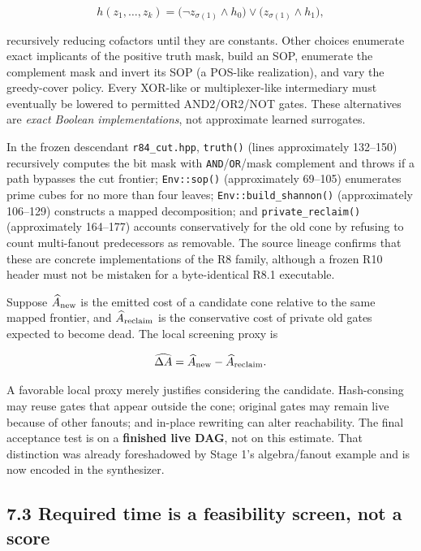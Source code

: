 \[
h(z_1,\ldots,z_k)
=\bigl(\neg z_{\sigma(1)}\land h_0\bigr)
 \lor\bigl(z_{\sigma(1)}\land h_1\bigr),
\]

recursively reducing cofactors until they are constants. Other choices enumerate exact implicants of the positive truth mask, build an SOP, enumerate the complement mask and invert its SOP (a POS-like realization), and vary the greedy-cover policy. Every XOR-like or multiplexer-like intermediary must eventually be lowered to permitted AND2/OR2/NOT gates. These alternatives are \emph{exact Boolean implementations}, not approximate learned surrogates.

In the frozen descendant \texttt{r84\_cut.hpp}, \texttt{truth()} (lines approximately 132--150) recursively computes the bit mask with \texttt{AND}/\texttt{OR}/mask complement and throws if a path bypasses the cut frontier; \texttt{Env::sop()} (approximately 69--105) enumerates prime cubes for no more than four leaves; \texttt{Env::build\_shannon()} (approximately 106--129) constructs a mapped decomposition; and \texttt{private\_reclaim()} (approximately 164--177) accounts conservatively for the old cone by refusing to count multi-fanout predecessors as removable. The source lineage confirms that these are concrete implementations of the R8 family, although a frozen R10 header must not be mistaken for a byte-identical R8.1 executable.

Suppose \(\widehat A_{\rm new}\) is the emitted cost of a candidate cone relative to the same mapped frontier, and \(\widehat A_{\rm reclaim}\) is the conservative cost of private old gates expected to become dead. The local screening proxy is

\[
\widehat{\Delta A}=\widehat A_{\rm new}-\widehat A_{\rm reclaim}.
\]

A favorable local proxy merely justifies considering the candidate. Hash-consing may reuse gates that appear outside the cone; original gates may remain live because of other fanouts; and in-place rewriting can alter reachability. The final acceptance test is on a \textbf{finished live DAG}, not on this estimate. That distinction was already foreshadowed by Stage 1's algebra/fanout example and is now encoded in the synthesizer.

\subsection{7.3 Required time is a feasibility screen, not a score}\label{required-time-is-a-feasibility-screen-not-a-score}

